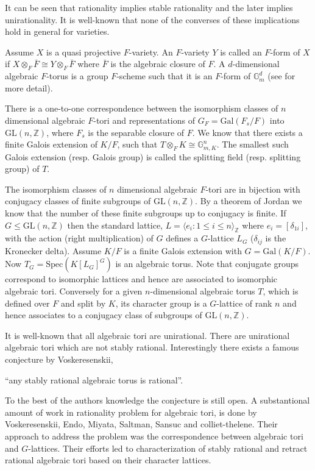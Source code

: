 \documentclass[12pt]{article}
\theoremstyle{plain}
\theoremstyle{definition}
\newcommand{\Z}{\ensuremath{\mathbb{Z}}}
\begin{document}
It can be seen that rationality implies stable rationality and the later implies 
unirationality. It is well-known that none of the converses of these implications
hold in general for varieties. 

Assume $X$ is a quasi projective $F$-variety. An $F$-variety $Y$ is called an 
$F$-form of $X$ if $X \otimes_F \bar{F} \cong Y \otimes_F \bar{F}$ where $\bar{F}$ is the algebraic closure of $F$. A $d$-dimensional algebraic 
$F$-torus is a group $F$-scheme such that it is an $F$-form of $\mathbb{G}_m^d$ (see \cite[Section 1.3]{Voskresenskii} for more detail).

There is a one-to-one correspondence between the isomorphism classes of 
$n$ dimensional algebraic $F$-tori and representations of $G_F = \mathrm{Gal}(F_s/F)$ 
into $\mathrm{GL}(n,\Z)$, where $F_s$ is the separable closure of $F$. We know that
 there exists a finite Galois extension of $K/F$, such that 
$T \otimes_F K \cong \mathbb{G}_{m,K}^n$. The smallest such Galois extension 
(resp. Galois group) is called the splitting field (resp. splitting group)
 of $T$.
 
The isomorphism classes of $n$ dimensional algebraic $F$-tori are in bijection 
with conjugacy classes of finite subgroups of $\mathrm{GL}(n,\Z)$. By a theorem of Jordan
 we know that the number 
of these finite subgroups up to conjugacy is finite. If $G \leq \mathrm{GL}(n,\Z)$ then 
the standard lattice, $L = \langle e_i: 1 \leq i \leq n \rangle_\Z$ where $e_i = [\delta_{1i}]$,
with the action (right multiplication) of $G$ defines a $G$-lattice $L_G$ ($\delta_{ij}$ is the Kronecker delta). 
Assume $K/F$ is a finite Galois extension with $G = \mathrm{Gal}(K/F)$. Now $T_G = \mathrm{Spec}(K[L_G]^G)$
is an algebraic torus. Note that conjugate groups correspond to isomorphic 
lattices and hence are associated to isomorphic algebraic tori. Conversely for 
a given $n$-dimensional algebraic torus $T$, which is defined over $F$ and split 
by $K$, its character group is a $G$-lattice of rank $n$ and hence associates 
to a conjugacy class of subgroups of $\mathrm{GL}(n,\Z)$.  

It is well-known that all algebraic tori are unirational. There are unirational algebraic tori which 
are not stably rational. Interestingly there exists a famous conjecture by Voskeresenskii,
\begin{center}
 ``any stably rational algebraic torus is rational''.
 \end{center} To the 
best of the authors knowledge the conjecture is still open. A substantional amount of work in rationality problem for algebraic tori, is done by Voskeresenskii, Endo, Miyata, Saltman, 
Sansuc and colliet-thelene. Their approach to address the problem was the
correspondence between algebraic tori and $G$-lattices. Their efforts led to 
characterization of stably rational and retract rational algebraic tori based 
on their character lattices.
\end{document}
